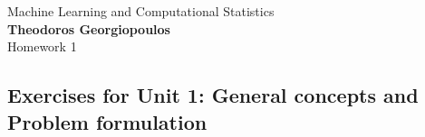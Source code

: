 \documentclass[12pt]{book}
\theoremstyle{definition}
\begin{document}
\begin{center}
{\Large Machine Learning and Computational Statistics}\\
\large\textbf{Theodoros Georgiopoulos}\\ %
\Large Homework 1 %
\end{center}

\vspace{0.2 cm}


\subsection*{Exercises for Unit 1: General concepts and Problem formulation}

\vspace{0.2 cm}
\end{document}

